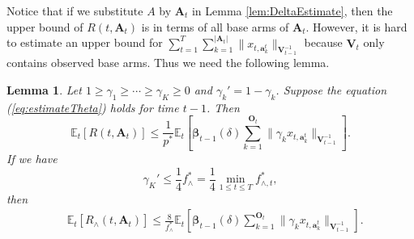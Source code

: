 \documentclass{article}
\newcommand{\bbeta}{\boldsymbol{\beta}}
\newcommand{\EE}{\mathbb{E}}
\newcommand{\bA}{\mathbf{A}}
\newcommand{\ba}{\mathbf{a}}
\newcommand{\bO}{\mathbf{O}}
\newcommand{\bU}{\mathbf{U}}
\newcommand{\bV}{\mathbf{V}}
\newcommand{\cH}{\mathcal{H}}
\newcommand{\abs}[1]{\left| #1 \right|}
\newcommand{\norm}[1]{\| #1 \|}
\newtheorem{lemma}[theorem]{Lemma}%
\begin{document}
Notice that if we substitute $A$ by $\bA_t$ in Lemma \ref{lem:DeltaEstimate}, then the upper bound of $R(t, \bA_t)$ is in terms of all base arms of $\bA_t$. 
However, it is hard to estimate an upper bound for
	$\sum_{t=1}^T \sum_{k=1}^{\abs{\bA_t}} \norm{ x_{t, \ba_k^t} }_{ \bV_{t-1}^{-1} }$ 
	because $\bV_t$ only contains observed base arms. Thus we need the following lemma.

\begin{lemma}
\label{lem:DeltaEsimateWithP*}
Let $1 \geq \gamma_1 \geq \cdots \geq \gamma_K \geq 0$ and $\gamma_k' = 1 - \gamma_k$. 
Suppose the equation (\ref{eq:estimateTheta}) holds for time $t-1$. Then
$$
\EE_t[R(t, \bA_t)] \leq \frac{1}{p^*} \EE_t \left[ \bbeta_{t-1}(\delta) \sum_{k=1}^{\bO_t}\norm{\gamma_k x_{t,\ba_k^t}}_{\bV_{t-1}^{-1}} \right].
$$
If we have
$$
\gamma_K' \le \frac{1}{4} f_{\wedge}^{\ast} = \frac{1}{4} \min_{1 \leq t \leq T} f_{\wedge, t}^{\ast},
$$
then
\begin{align*}
&\EE_t [R_{\wedge}(t, \bA_t) ] \leq \frac{8}{f_{\wedge}^{\ast}} \EE_t \left[ \bbeta_{t-1}(\delta)\sum_{k=1}^{\bO_t}\norm{\gamma_k x_{t,\ba_k^t}}_{\bV_{t-1}^{-1}} \right].
\end{align*}
\end{lemma}
\end{document}
